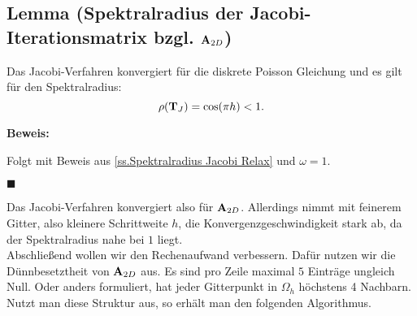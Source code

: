 \subsection{Lemma (Spektralradius der Jacobi-Iterationsmatrix bzgl. ${\textbf{A}}_{2D}$)}\label{ss.Spektralradius Jacobi}

Das Jacobi-Verfahren konvergiert für die diskrete Poisson Gleichung und es gilt für den Spektralradius:
\begin{equation}
\rho({\textbf{T}}_{J}) = \cos(\pi h) < 1.
\end{equation}

\textbf{Beweis:}\label{b.Spektral Jacobi}

Folgt mit Beweis aus \autoref{ss.Spektralradius Jacobi Relax} und $\omega = 1$.
\begin{flushright}
$\blacksquare$
\end{flushright}


Das Jacobi-Verfahren konvergiert also für ${\textbf{A}}_{2D}$. Allerdings nimmt mit feinerem Gitter, also kleinere Schrittweite $h$, die Konvergenzgeschwindigkeit stark ab, da der Spektralradius nahe bei $1$ liegt.\\
Abschließend wollen wir den Rechenaufwand verbessern. Dafür nutzen wir die Dünnbesetztheit von ${\textbf{A}}_{2D}$ aus. Es sind pro Zeile maximal $5$ Einträge ungleich Null. Oder anders formuliert, hat jeder Gitterpunkt in $\Omega_{h}$ höchstens 4 Nachbarn. Nutzt man diese Struktur aus, so erhält man den folgenden Algorithmus. 

